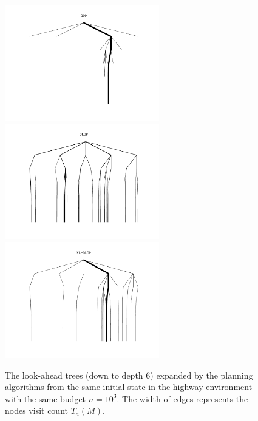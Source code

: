 \begin{figure}[pth]
	\centering
	
	\includegraphics[width=0.6\textwidth]{img/tree_OPD_svg-tex} \includegraphics[width=0.6\textwidth]{img/tree_OLOP_svg-tex}
	\includegraphics[width=0.6\textwidth]{img/tree_KL-OLOP_svg-tex}
	
	\caption{The look-ahead trees (down to depth 6) expanded by the planning algorithms from the same initial state in the highway environment with the same budget $n=10^3$. The width of edges represents the nodes visit count $T_a(M)$.}
	\label{fig:trees}
\end{figure}

